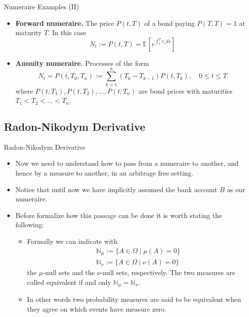 \documentclass{beamer}
\begin{document}
\begin{frame}{Numeraire Examples (II)}
  \begin{itemize}
  \item<1-> \textbf{Forward numeraire.} The price $P(t,T)$ of a bond paying $P(T,T)=1$ at maturity $T$. In this case
    \begin{equation*}
      N_t := P(t,T)=\mathbb{E}\left[e^{\int_t^T r_s ds}\right]
    \end{equation*}
  \item<2-> \textbf{Annuity numeraire.} Processes of the form
    \begin{equation*}
      N_t = P(t, T_0, T_n) := \sum_{k=1}^{n}(T_k - T_{k-1})P(t, T_k), \quad 0 \le t \le T
    \end{equation*}
    where $P(t,T_1),P(t,T_2),\ldots,P(t,T_n)$ are bond prices with maturities $T_1 < T_2 < \ldots < T_n$.
  \end{itemize}
\end{frame}

\subsection{Radon-Nikodym Derivative}
\begin{frame}{Radon-Nikodym Derivative}
  \begin{itemize}
  \item Now we need to understand how to pass from a numeraire to another, and hence by a measure to another, in an arbitrage free setting.
  \item Notice that until now we have implicitly assumed the bank account $B$ as our numeraire.
  \item Before formalize how this passage can be done it is worth stating the following:
  	\begin{itemize}
	  \item Formally we can indicate with
	  \begin{equation*}
	  	\begin{gathered}
	  	\mathbb{N}_\mu := \{A\in \Omega \mid \mu(A)=0\}\\
  	  	\mathbb{N}_\nu := \{A\in \Omega \mid \nu(A)=0\}
  	  \end{gathered}
    \end{equation*}
  	the $\mu$-null sets and the $\nu$-null sets, respectively. 
  	The two measures are called equivalent if and only $\mathbb {N}_\mu= \mathbb{N}_\nu$.
	\item In other words two probability measures are said to be equivalent when they agree on which events have measure zero.
  \end{itemize}
  \end{itemize}
\end{frame}
\end{document}
